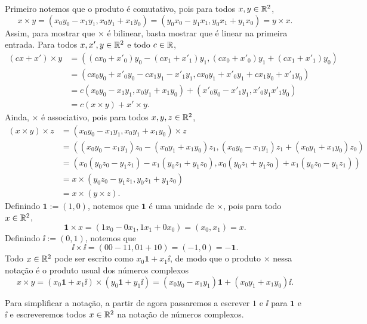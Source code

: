Primeiro notemos que o produto é comutativo, pois para todos $x,y \in \mathbb{R}^2$,
	\begin{equation*}
	x \times y = (x_0y_0-x_1y_1,x_0y_1+x_1y_0) = (y_0x_0-y_1x_1,y_0x_1+y_1x_0) = y \times x.
	\end{equation*}
Assim, para mostrar que $\times$ é bilinear, basta mostrar que é linear na primeira entrada. Para todos $x,x',y \in \mathbb{R}^2$ e todo $c \in \mathbb{R}$,
	\begin{align*}
	(cx+x') \times y &= ((cx_0+x'_0)y_0-(cx_1+x'_1)y_1,(cx_0+x'_0)y_1+(cx_1+x'_1)y_0) \\
		&= (cx_0y_0+x'_0y_0-cx_1y_1-x'_1y_1,cx_0y_1+x'_0y_1+cx_1y_0+x'_1y_0) \\
		&= c(x_0y_0-x_1y_1,x_0y_1+x_1y_0) + (x'_0y_0-x'_1y_1,x'_0y_1x'_1y_0) \\
		&= c (x \times y) + x' \times y.
	\end{align*}
Ainda, $\times$ é associativo, pois para todos $x,y,z \in \mathbb{R}^2$,
	\begin{align*}
	(x \times y) \times z &= (x_0y_0-x_1y_1,x_0y_1+x_1y_0) \times z \\
		&= ((x_0y_0-x_1y_1)z_0 - (x_0y_1+x_1y_0)z_1 , (x_0y_0-x_1y_1)z_1 + (x_0y_1+x_1y_0)z_0 ) \\
		&= (x_0(y_0z_0-y_1z_1)-x_1(y_0z_1+y_1z_0),x_0(y_0z_1+y_1z_0)+x_1(y_0z_0-y_1z_1)) \\
		&= x \times (y_0z_0-y_1z_1,y_0z_1+y_1z_0) \\
		&= x \times (y \times z).
	\end{align*}
Definindo $\bm 1 := (1,0)$, notemos que $\bm 1$ é uma unidade de $\times$, pois para todo $x \in \mathbb{R}^2$,
	\begin{equation*}
	\bm 1 \times x = (1x_0-0x_1,1x_1+0x_0) = (x_0,x_1) = x.
	\end{equation*}
Definindo $\bm \ii := (0,1)$, notemos que
	\begin{equation*}
	\bm \ii \times \bm \ii = (00-11,01+10) = (-1,0) = -\bm 1.
	\end{equation*}
Todo $x \in \mathbb{R}^2$ pode ser escrito como $x_0\bm 1 + x_1 \bm \ii$, de modo que o produto $\times$ nessa notação é o produto usual dos números complexos
	\begin{equation*}
	x \times y = (x_0\bm 1 + x_1 \bm \ii) \times (y_0\bm 1 + y_1 \bm \ii) = (x_0y_0-x_1y_1)\bm 1 + (x_0y_1+x_1y_0)\bm \ii.
	\end{equation*}

Para simplificar a notação, a partir de agora passaremos a escrever $1$ e $\ii$ para $\bm 1$ e $\bm \ii$ e escreveremos todos $x \in \mathbb{R}^2$ na notação de números complexos.

